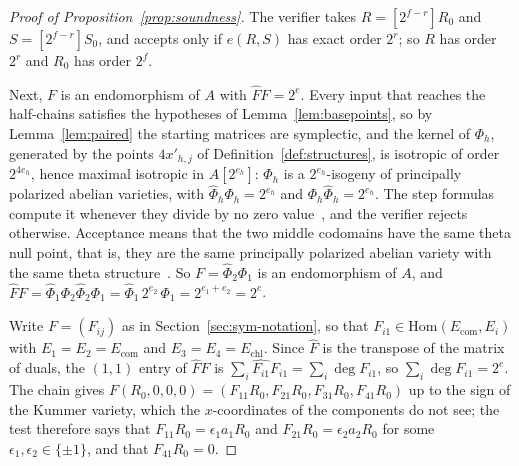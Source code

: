 \documentclass[version=preprint]{iacrcc}
\newcommand{\Ecom}{E_{\mathrm{com}}}
\newcommand{\Echl}{E_{\mathrm{chl}}}
\begin{document}
    \begin{proof}[Proof of Proposition~\ref{prop:soundness}]
        The verifier takes $R = [2^{f - r}]R_0$ and $S = [2^{f - r}]S_0$, and
        accepts only if $e(R, S)$ has exact order $2^r$; so $R$ has order $2^r$
        and $R_0$ has order $2^f$.

        Next, $F$ is an endomorphism of $A$ with $\widehat F F = 2^e$. Every
        input that reaches the half-chains satisfies the hypotheses of
        Lemma~\ref{lem:basepoints}, so by Lemma~\ref{lem:paired} the starting
        matrices are symplectic, and the kernel of $\Phi_h$, generated by the
        points $4x'_{h,j}$ of Definition~\ref{def:structures}, is isotropic of
        order $2^{4e_h}$, hence maximal isotropic in $A[2^{e_h}]$: $\Phi_h$ is
        a $2^{e_h}$-isogeny of principally polarized abelian varieties, with
        $\widehat\Phi_h \Phi_h = 2^{e_h}$ and $\Phi_h \widehat\Phi_h =
        2^{e_h}$. The step formulas compute it whenever they divide by no zero
        value~\cite{Dar24}, and the verifier rejects otherwise. Acceptance
        means that the two middle codomains have the same theta null point,
        that is, they are the same principally polarized abelian variety with
        the same theta structure~\cite[Section 4.5]{DLRW24}. So $F =
        \widehat\Phi_2 \Phi_1$ is an endomorphism of $A$, and $\widehat F F =
        \widehat\Phi_1 \Phi_2 \widehat\Phi_2 \Phi_1 = \widehat\Phi_1 \,
        2^{e_2} \, \Phi_1 = 2^{e_1 + e_2} = 2^e$.

        Write $F = (F_{ij})$ as in Section~\ref{sec:sym-notation}, so that
        $F_{i1} \in \mathrm{Hom}(\Ecom, E_i)$ with $E_1 = E_2 = \Ecom$ and $E_3
        = E_4 = \Echl$. Since $\widehat F$ is the transpose of the matrix of
        duals, the $(1, 1)$ entry of $\widehat F F$ is $\sum_i \widehat{F_{i1}}
        F_{i1} = \sum_i \deg F_{i1}$, so $\sum_i \deg F_{i1} = 2^e$. The chain
        gives $F(R_0, 0, 0, 0) = (F_{11}R_0, F_{21}R_0, F_{31}R_0, F_{41}R_0)$ up to the
        sign of the Kummer variety, which the $x$-coordinates of the components
        do not see; the test therefore says that $F_{11}R_0 = \epsilon_1 a_1 R_0$
        and $F_{21}R_0 = \epsilon_2 a_2 R_0$ for some $\epsilon_1, \epsilon_2 \in
        \{\pm 1\}$, and that $F_{41}R_0 = 0$.


\end{proof}
\end{document}

